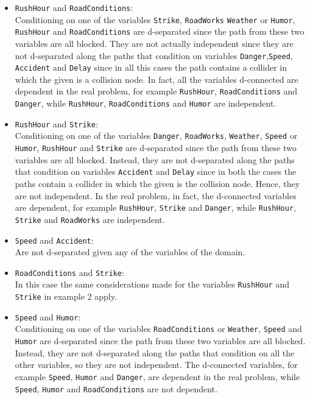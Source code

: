 \documentclass[a4paper,12pt]{article} %
\begin{document}
\begin{itemize}
	\item \texttt{RushHour} and \texttt{RoadConditions}:\\	
	Conditioning on one of the variables \texttt{Strike}, \texttt{RoadWorks} \texttt{Weather} or \texttt{Humor}, \texttt{RushHour} and \texttt{RoadConditions} are d-separated since the path from these two variables are all blocked.
	They are not actually independent since they are not d-separated along the paths that condition on variables
	\texttt{Danger},\texttt{Speed}, \texttt{Accident} and \texttt{Delay} since in all this cases the path contains a collider in which the given is a collision node.
	In fact, all the variables d-connected are dependent in the real problem, for example \texttt{RushHour}, \texttt{RoadConditions} and \texttt{Danger}, while \texttt{RushHour}, \texttt{RoadConditions} and \texttt{Humor} are independent.
	
	\item \texttt{RushHour} and \texttt{Strike}:\\
	Conditioning on one of the variables \texttt{Danger}, \texttt{RoadWorks}, \texttt{Weather}, \texttt{Speed} or \texttt{Humor}, \texttt{RushHour} and \texttt{Strike} are d-separated since the path from these two variables are all blocked.
	Instead, they are not d-separated along the paths that condition on variables \texttt{Accident} and \texttt{Delay} since in both the cases the paths contain a collider in which the given is the collision node. Hence, they are not independent.
	In the real problem, in fact, the d-connected variables are dependent, for example \texttt{RushHour}, \texttt{Strike} and \texttt{Danger}, while \texttt{RushHour}, \texttt{Strike} and \texttt{RoadWorks} are independent.
	
	\item \texttt{Speed} and \texttt{Accident}:\\
	Are not d-separated given any of the variables of the domain.
	
	\item \texttt{RoadConditions} and \texttt{Strike}:\\
	In this case the same considerations made for the variables \texttt{RushHour} and \texttt{Strike} in example 2 apply.
	
	\item \texttt{Speed} and \texttt{Humor}:\\
	Conditioning on one of the variables \texttt{RoadConditions} or \texttt{Weather}, \texttt{Speed} and \texttt{Humor} are d-separated since the path from these two variables are all blocked.
	Instead, they are not d-separated along the paths that condition on all the other variables, so they are not independent.
	The d-connected variables, for example \texttt{Speed}, \texttt{Humor} and \texttt{Danger}, are dependent in the real problem, while \texttt{Speed}, \texttt{Humor} and \texttt{RoadConditions} are not dependent.

\end{itemize}
\end{document}
